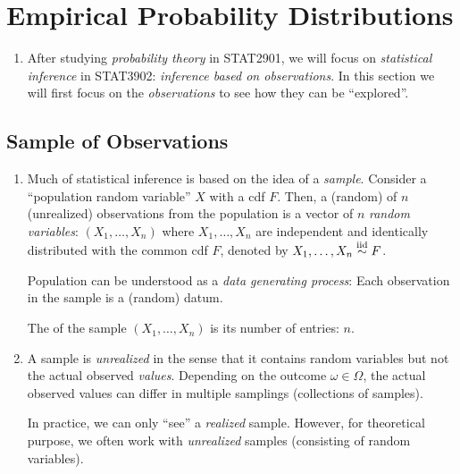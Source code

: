 \section{Empirical Probability Distributions}
\label{sect:empirical-prob-dist}
\begin{enumerate}
\item After studying \emph{probability theory} in STAT2901, we will focus on
\emph{statistical inference} in STAT3902: \emph{inference based on
observations}. In this section we will first focus on the \emph{observations} to
see how they can be ``explored''.
\end{enumerate}
\subsection{Sample of Observations}
\begin{enumerate}
\item Much of statistical inference is based on the idea of a \emph{sample}.
Consider a ``population random variable'' \(X\) with a cdf \(F\). Then, a
(random)  of \(n\) (unrealized) observations from the population
is a vector of \(n\) \emph{random variables}: \((X_1,\dotsc,X_n)\) where
\(X_1,\dotsc,X_n\) are independent and identically distributed with the common
cdf \(F\), denoted by \(X_1,\dotsc,X_n\overset{\text{iid}}{\sim} F\).
\begin{center}
\end{center}
\begin{intuition}
Population can be understood as a \emph{data generating process}: Each
observation in the sample is a (random) datum.
\end{intuition}

\begin{note}
The  of the sample \((X_1,\dotsc,X_n)\) is its number of
entries: \(n\).
\end{note}
\item A sample is \emph{unrealized} in the sense that it contains random
variables but not the actual observed \emph{values}. Depending on the outcome
\(\omega\in\Omega\), the actual observed values can differ in multiple
samplings (collections of samples).

In practice, we can only ``see''  a \emph{realized} sample. However, for
theoretical purpose, we often work with \emph{unrealized} samples (consisting of
random variables).
\end{enumerate}

